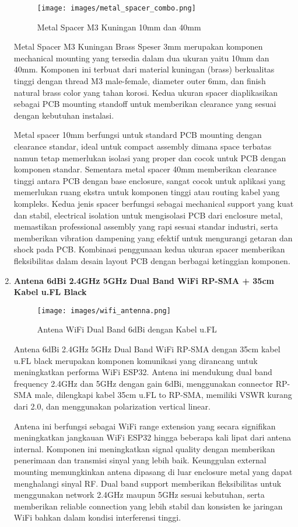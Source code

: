 \documentclass[12pt,a4paper]{article}
\begin{document}
\begin{enumerate}[leftmargin=0pt,itemsep=1em]
\begin{figure}[H]
\centering
\texttt{[image: images/metal\_spacer\_combo.png]}
\caption{Metal Spacer M3 Kuningan 10mm dan 40mm}
\label{fig:metal_spacer_combo}
\end{figure}

Metal Spacer M3 Kuningan Brass Speser 3mm merupakan komponen mechanical mounting yang tersedia dalam dua ukuran yaitu 10mm dan 40mm. Komponen ini terbuat dari material kuningan (brass) berkualitas tinggi dengan thread M3 male-female, diameter outer 6mm, dan finish natural brass color yang tahan korosi. Kedua ukuran spacer diaplikasikan sebagai PCB mounting standoff untuk memberikan clearance yang sesuai dengan kebutuhan instalasi.

Metal spacer 10mm berfungsi untuk standard PCB mounting dengan clearance standar, ideal untuk compact assembly dimana space terbatas namun tetap memerlukan isolasi yang proper dan cocok untuk PCB dengan komponen standar. Sementara metal spacer 40mm memberikan clearance tinggi antara PCB dengan base enclosure, sangat cocok untuk aplikasi yang memerlukan ruang ekstra untuk komponen tinggi atau routing kabel yang kompleks. Kedua jenis spacer berfungsi sebagai mechanical support yang kuat dan stabil, electrical isolation untuk mengisolasi PCB dari enclosure metal, memastikan professional assembly yang rapi sesuai standar industri, serta memberikan vibration dampening yang efektif untuk mengurangi getaran dan shock pada PCB. Kombinasi penggunaan kedua ukuran spacer memberikan fleksibilitas dalam desain layout PCB dengan berbagai ketinggian komponen.

\item \textbf{Antena 6dBi 2.4GHz 5GHz Dual Band WiFi RP-SMA + 35cm Kabel u.FL Black}

\begin{figure}[H]
\centering
\texttt{[image: images/wifi\_antenna.png]}
\caption{Antena WiFi Dual Band 6dBi dengan Kabel u.FL}
\label{fig:wifi_antenna}
\end{figure}

Antena 6dBi 2.4GHz 5GHz Dual Band WiFi RP-SMA dengan 35cm kabel u.FL black merupakan komponen komunikasi yang dirancang untuk meningkatkan performa WiFi ESP32. Antena ini mendukung dual band frequency 2.4GHz dan 5GHz dengan gain 6dBi, menggunakan connector RP-SMA male, dilengkapi kabel 35cm u.FL to RP-SMA, memiliki VSWR kurang dari 2.0, dan menggunakan polarization vertical linear.

Antena ini berfungsi sebagai WiFi range extension yang secara signifikan meningkatkan jangkauan WiFi ESP32 hingga beberapa kali lipat dari antena internal. Komponen ini meningkatkan signal quality dengan memberikan penerimaan dan transmisi sinyal yang lebih baik. Keunggulan external mounting memungkinkan antena dipasang di luar enclosure metal yang dapat menghalangi sinyal RF. Dual band support memberikan fleksibilitas untuk menggunakan network 2.4GHz maupun 5GHz sesuai kebutuhan, serta memberikan reliable connection yang lebih stabil dan konsisten ke jaringan WiFi bahkan dalam kondisi interferensi tinggi.


\end{enumerate}
\end{document}
